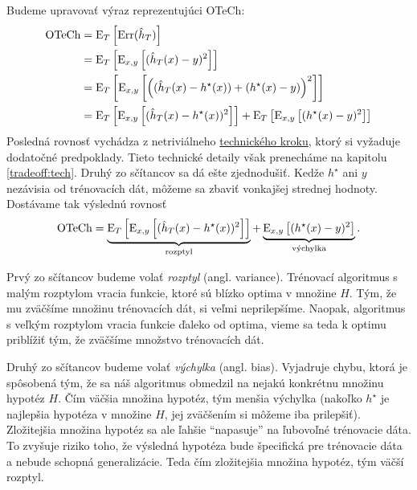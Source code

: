 Budeme upravovať výraz reprezentujúci OTeCh:
\begin{align}
  \text{OTeCh}
    &= \E_T \left[ \Err(\hat{h}_T) \right] \\
    &= \E_T \left[ \E_{x,y} \left[ (\hat{h}_T(x) - y)^2 \right] \right] \\
    &= \E_T \left[ \E_{x,y} \left[ \left( (\hat{h}_T(x) - h^\star(x)) + (h^\star(x) - y) \right)^2 \right] \right]\\
    &= \E_T \left[ \E_{x,y} \left[ (\hat{h}_T(x) - h^\star(x))^2 \right] \right]
    + \E_T \left[ \E_{x,y} \left[ (h^\star(x) - y)^2 \right] \right] 
\label{biasvarianceodvodenie}
\end{align}
Posledná rovnosť vychádza z netriviálneho \hyperref[tradeoff:tech]{technického kroku},
ktorý si vyžaduje dodatočné predpoklady. Tieto technické detaily však prenecháme
na kapitolu \ref{tradeoff:tech}.
Druhý zo sčítancov sa dá ešte zjednodušiť. Kedže $h^\star$ ani $y$
nezávisia od trénovacích dát, môžeme sa zbaviť vonkajšej strednej
hodnoty. Dostávame tak výslednú rovnosť
\begin{equation}
  \text{OTeCh}
    = \underbrace{\E_T \left[ \E_{x,y} \left[ (\hat{h}_T(x) - h^\star(x))^2 \right] \right]}_{\vRozptyl}
    + \underbrace{\E_{x,y} \left[ (h^\star(x) - y)^2 \right]}_{\vVychylka}.
  \label{eq:vr1}
\end{equation}

Prvý zo sčítancov budeme volať \emph{rozptyl} (angl. variance).
Trénovací algoritmus
s malým rozptylom vracia funkcie, ktoré sú blízko optima v množine $H$.
Tým, že mu zväčšíme množinu trénovacích dát, si veľmi neprilepšíme.
Naopak, algoritmus s veľkým rozptylom vracia funkcie ďaleko od optima,
vieme sa teda k optimu priblížiť tým, že zväčšíme množstvo trénovacích
dát.


Druhý zo sčítancov budeme volať \emph{výchylka} (angl. bias).
Vyjadruje chybu, ktorá
je spôsobená tým, že sa náš algoritmus obmedzil na nejakú konkrétnu
množinu hypotéz $H$. Čím väčšia množina hypotéz, tým menšia výchylka
(nakoľko $h^\star$ je najlepšia hypotéza v množine $H$, jej zväčšením
si môžeme iba prilepšiť). Zložitejšia množina hypotéz sa ale ľahšie
``napasuje'' na ľubovoľné trénovacie dáta. To zvyšuje riziko toho,
že výsledná hypotéza bude špecifická pre trénovacie dáta a nebude
schopná generalizácie. Teda čím zložitejšia množina hypotéz, tým
väčší rozptyl.

\medskip

